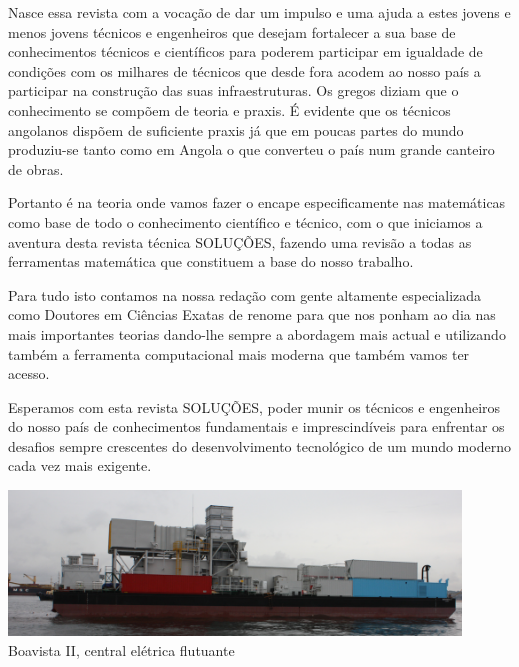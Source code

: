 Nasce essa revista com a vocação de dar um impulso e uma ajuda a estes
jovens e menos jovens técnicos e engenheiros que desejam fortalecer a
sua base de conhecimentos técnicos e científicos para poderem
participar em igualdade de condições com os milhares de técnicos que
desde fora acodem ao nosso país a participar na construção das suas
infraestruturas.  Os gregos diziam que o conhecimento se compõem de
teoria e praxis. É evidente que os técnicos angolanos dispõem de
suficiente praxis já que em poucas partes do mundo produziu-se tanto
como em Angola o que converteu o país num grande canteiro de obras.

Portanto é na teoria onde vamos fazer o encape especificamente nas
matemáticas como base de todo o conhecimento científico e técnico, com
o que iniciamos a aventura desta revista técnica SOLUÇÕES, fazendo uma
revisão a todas as ferramentas matemática que constituem a base do
nosso trabalho.

Para tudo isto contamos na nossa redação com gente altamente
especializada como Doutores em Ciências Exatas de renome para que nos
ponham ao dia nas mais importantes teorias dando-lhe sempre a
abordagem mais actual e utilizando também a ferramenta computacional
mais moderna que também vamos ter acesso.

Esperamos com esta revista SOLUÇÕES, poder munir os técnicos e
engenheiros do nosso país de conhecimentos fundamentais e
imprescindíveis para enfrentar os desafios sempre crescentes do
desenvolvimento tecnológico de um mundo moderno cada vez mais
exigente.


\vspace{20pt}

\begin{figurebox}
  \vspace{15pt}
  \centering
  \includegraphics[width=0.9\textwidth]{barco.png}\\
  {Boavista II, central elétrica flutuante}
  \vspace{10pt}
\end{figurebox}

\newpage


